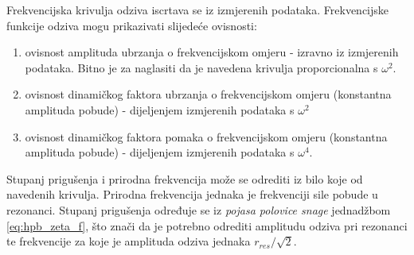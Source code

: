 Frekvencijska krivulja odziva iscrtava se iz izmjerenih podataka. Frekvencijske
funkcije odziva mogu prikazivati slijedeće ovisnosti:
\begin{enumerate}
    \item ovisnost amplituda ubrzanja o frekvencijskom omjeru - izravno iz
        izmjerenih podataka. Bitno je za naglasiti da je navedena krivulja
        proporcionalna s $\omega^2$.

    \item ovisnost dinamičkog faktora ubrzanja o frekvencijskom omjeru (konstantna
        amplituda pobude) - dijeljenjem izmjerenih podataka s $\omega^2$ 

    \item ovisnost dinamičkog faktora pomaka o frekvencijskom omjeru (konstantna
        amplituda pobude) - dijeljenjem izmjerenih podataka s $\omega^4$.
\end{enumerate}

Stupanj prigušenja i prirodna frekvencija može se odrediti iz bilo koje od navedenih
krivulja. Prirodna frekvencija jednaka je frekvenciji sile pobude u rezonanci.
Stupanj prigušenja određuje se iz \textit{pojasa polovice snage} jednadžbom
\eqref{eq:hpb_zeta_f}, što znači da je potrebno odrediti amplitudu odziva pri
rezonanci te frekvencije za koje je amplituda odziva jednaka $r_{res}/\sqrt{2}$.

